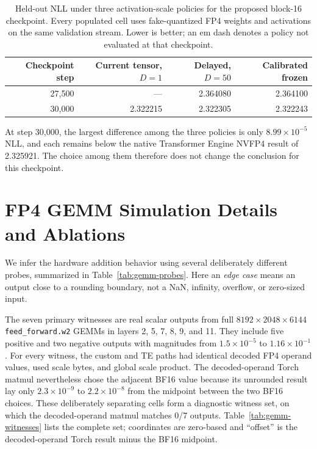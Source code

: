 \documentclass[11pt]{article}
\newcommand{\nv}{NVFP4}
\begin{document}
\begin{table}[H]
  \centering
  \small
  \caption{Held-out NLL under three activation-scale
  policies for the proposed block-16 checkpoint.  Every populated cell uses
  fake-quantized FP4 weights and activations on the same validation stream.
  Lower is better; an em dash denotes a policy not
  evaluated at that checkpoint.}
  \label{tab:activation-scale-policies}
  \begin{tabular}{@{}rrrr@{}}
    \toprule
    Checkpoint step & Current tensor, $D=1$ & Delayed, $D=50$ & Calibrated frozen \\
    \midrule
    27,500 & --- & 2.364080 & 2.364100 \\
    30,000 & 2.322215 & 2.322305 & 2.322243 \\
    \bottomrule
  \end{tabular}
\end{table}

At step 30,000, the largest difference among the three policies is only
$8.99\times10^{-5}$ NLL, and each remains below the native Transformer Engine
\nv{} result of 2.325921.  The choice among them therefore does not change the
conclusion for this checkpoint.

\section{FP4 GEMM Simulation Details and Ablations}
\label{app:gemm-ablations}

We infer the hardware addition behavior using several deliberately different
probes, summarized in
Table~\ref{tab:gemm-probes}.  Here an \emph{edge case} means an output close to
a rounding boundary, not a NaN, infinity, overflow, or zero-sized input.

The seven primary witnesses are real scalar outputs from full
$8192\mathbin{\times}2048\mathbin{\times}6144$ \texttt{feed\_forward.w2}
GEMMs in layers 2, 5, 7, 8, 9, and 11.  They include five positive and two
negative outputs with magnitudes from $1.5\times10^{-5}$ to $1.16\times10^{-1}$.
For every witness, the custom and TE paths had identical decoded FP4 operand
values, used scale bytes, and global scale product.  The decoded-operand Torch
matmul nevertheless chose the adjacent BF16 value because
its unrounded result lay only $2.3\times10^{-9}$ to $2.2\times10^{-8}$ from the
midpoint between the two BF16 choices.  These deliberately separating cells
form a diagnostic witness set, on which the decoded-operand matmul matches 0/7 outputs.
Table~\ref{tab:gemm-witnesses} lists the complete set; coordinates are
zero-based and ``offset'' is the decoded-operand Torch result minus the BF16
midpoint.
\end{document}
